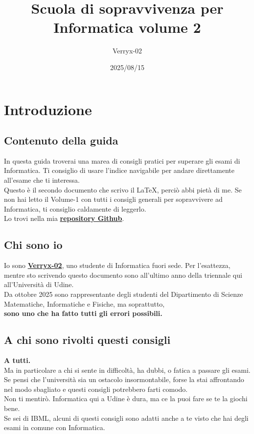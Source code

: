 \documentclass[18pt]{extarticle}
\title{Scuola di sopravvivenza per Informatica volume 2}
\author{Verryx-02}
\date{2025/08/15}
\begin{document}
\maketitle

\tableofcontents
\newpage

\section{Introduzione}

\subsection{Contenuto della guida}
In questa guida troverai una marea di consigli pratici per superare gli esami di Informatica. Ti consiglio di usare l'indice navigabile per andare direttamente all'esame che ti interessa.\\
Questo è il secondo documento che scrivo il \LaTeX, perciò abbi pietà di me.
Se non hai letto il Volume-1 con tutti i consigli generali per sopravvivere ad Informatica, ti consiglio caldamente di leggerlo.\\
Lo trovi nella mia \href{https://github.com/Verryx-02/Scuola-di-sopravvivenza-per-studenti-di-Informatica}{\textbf{repository Github}}. 

\subsection{Chi sono io}
Io sono \href{https://github.com/Verryx-02}{\textbf{Verryx-02}}, uno studente di Informatica fuori sede. 
Per l'esattezza, mentre sto scrivendo questo documento sono all'ultimo anno della triennale qui all'Università di Udine.\\
Da ottobre 2025 sono rappresentante degli studenti del Dipartimento di Scienze Matematiche, Informatiche e Fisiche, ma soprattutto,\\
\textbf{sono uno che ha fatto tutti gli errori possibili.}


\subsection{A chi sono rivolti questi consigli}
\textbf{A tutti.}\\
Ma in particolare a chi si sente in difficoltà, ha dubbi, o fatica a passare gli esami.\\
Se pensi che l'università sia un ostacolo insormontabile, forse la stai affrontando nel modo sbagliato e questi consigli potrebbero farti comodo.\\
Non ti mentirò. Informatica qui a Udine è dura, ma ce la puoi fare se te la giochi bene.\\
Se sei di IBML, alcuni di questi consigli sono adatti anche a te visto che hai degli esami in comune con Informatica. 
\end{document}
